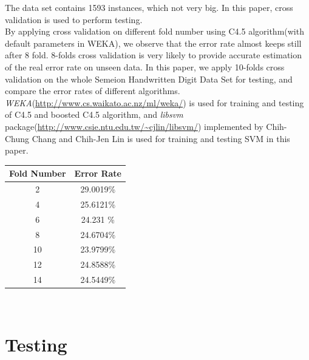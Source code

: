 \documentclass[a4paper,11pt]{article}
\begin{document}
The data set contains 1593 instances, which not very big. In this paper, cross validation is used to perform testing. \\
By applying cross validation on different fold number using C4.5 algorithm(with default parameters in WEKA), we observe that the error rate almost keeps still after 8 fold. 8-folds cross validation is very likely to provide accurate estimation of the real error rate on unseen data. In this paper, we apply 10-folds cross validation on the whole Semeion Handwritten Digit Data Set for testing, and compare the error rates of different algorithms.\\
\emph{WEKA}(\url{http://www.cs.waikato.ac.nz/ml/weka/}) is used for training and testing of C4.5 and boosted C4.5 algorithm, and \emph{libsvm} package(\url{http://www.csie.ntu.edu.tw/~cjlin/libsvm/}) implemented by Chih-Chung Chang and Chih-Jen Lin is used for training and testing SVM in this paper.\\

\vspace{0.5cm}
\begin{tabular}{c c}
Fold Number & Error Rate\\
\hline \hline
2  &29.0019\%\\
4  &25.6121\%\\
6  &24.231 \%\\
8  & 24.6704\%\\
10 & 23.9799\%\\
12 & 24.8588\%\\
14 & 24.5449\%\\
\end{tabular}
\vspace{0.5cm}\\
\section{Testing}
\end{document}
